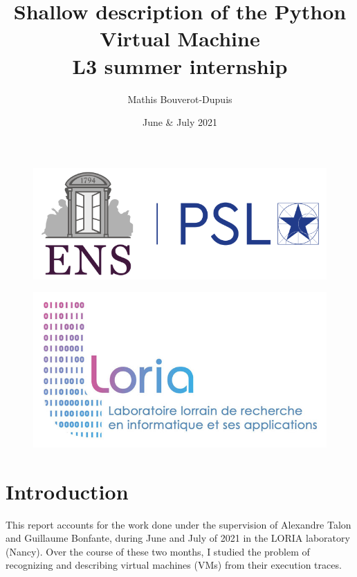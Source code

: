 \documentclass[english]{article}
\begin{document}
	
\title{Shallow description of the Python Virtual Machine \\ \large L3 summer internship}
\author{Mathis Bouverot-Dupuis}
\date{June \& July 2021}

\maketitle 

\begin{figure}[h]
	\centering 
	\includegraphics[width=.7\linewidth]{img/logoENS.png}	
\end{figure}
\begin{figure}[h]
	\centering 
	\includegraphics[width=.7\linewidth]{img/logoLORIA.jpg}
\end{figure} 

\newpage 

\tableofcontents
\newpage

\section{Introduction}
This report accounts for the work done under the supervision of Alexandre Talon and Guillaume Bonfante, during June and July of 2021 in the LORIA laboratory (Nancy). Over the course of these two months, I studied the problem of recognizing and describing virtual machines (VMs) from their execution traces.
\end{document}
